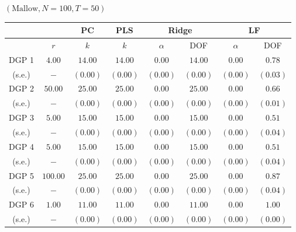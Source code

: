 
    \begin{center} $(\mathrm{Mallow}, N=100, T=50)$ \
        \begin{tabular}{cccccccc}
            \hline \hline 
            & & PC & PLS & \multicolumn{2}{c}{Ridge} & \multicolumn{2}{c}{LF} \\
            \hline 
            & $r$ & $k$ & $k$ & $\alpha$ & DOF & $\alpha$ & DOF \\
            \hline 
            DGP 1 & $4.00$ & $14.00$ & $14.00$ & $0.00$ & $14.00$ & $0.00$ & $0.78$ \\
            (s.e.) & $-$ & $(0.00)$ & $(0.00)$ & $(0.00)$ & $(0.00)$ & $(0.00)$ & $(0.03)$ \\
            DGP 2 & $50.00$ & $25.00$ & $25.00$ & $0.00$ & $25.00$ & $0.00$ & $0.66$ \\
            (s.e.) & $-$ & $(0.00)$ & $(0.00)$ & $(0.00)$ & $(0.00)$ & $(0.00)$ & $(0.01)$ \\
            DGP 3 & $5.00$ & $15.00$ & $15.00$ & $0.00$ & $15.00$ & $0.00$ & $0.51$ \\
            (s.e.) & $-$ & $(0.00)$ & $(0.00)$ & $(0.00)$ & $(0.00)$ & $(0.00)$ & $(0.04)$ \\
            DGP 4 & $5.00$ & $15.00$ & $15.00$ & $0.00$ & $15.00$ & $0.00$ & $0.51$ \\
            (s.e.) & $-$ & $(0.00)$ & $(0.00)$ & $(0.00)$ & $(0.00)$ & $(0.00)$ & $(0.04)$ \\
            DGP 5 & $100.00$ & $25.00$ & $25.00$ & $0.00$ & $25.00$ & $0.00$ & $0.87$ \\
            (s.e.) & $-$ & $(0.00)$ & $(0.00)$ & $(0.00)$ & $(0.00)$ & $(0.00)$ & $(0.04)$ \\
            DGP 6 & $1.00$ & $11.00$ & $11.00$ & $0.00$ & $11.00$ & $0.00$ & $1.00$ \\
            (s.e.) & $-$ & $(0.00)$ & $(0.00)$ & $(0.00)$ & $(0.00)$ & $(0.00)$ & $(0.00)$ \\
            \hline
        \end{tabular}
    \end{center}
    